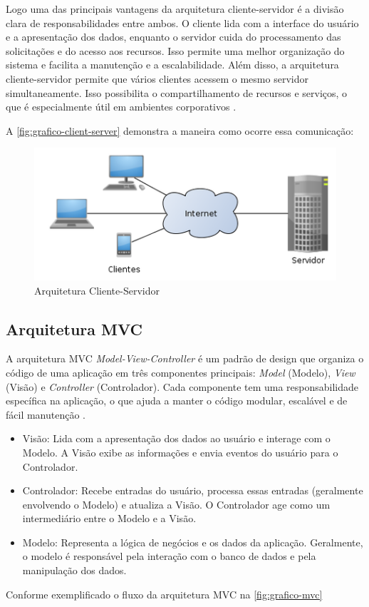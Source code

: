     Logo uma das principais vantagens da arquitetura cliente-servidor é a divisão clara de responsabilidades entre ambos. 
O cliente lida com a interface do usuário e a apresentação dos dados, enquanto o servidor cuida do processamento das solicitações e do acesso aos recursos. Isso permite uma melhor organização do sistema e facilita a manutenção e a escalabilidade.
Além disso, a arquitetura cliente-servidor permite que vários clientes acessem o mesmo servidor simultaneamente. Isso possibilita o compartilhamento de recursos e serviços, o que é especialmente útil em ambientes corporativos \cite{arqClientServer2}.

A \autoref{fig:grafico-client-server} demonstra a maneira como ocorre essa comunicação:

\begin{figure}[htb]
    \caption{\label{fig:grafico-client-server}Arquitetura Cliente-Servidor}
    \begin{center}
        \includegraphics[scale=0.9]{imagens/arquitetura-cliente-servidor.png}
    \end{center}
\end{figure}


\subsection{Arquitetura MVC}
A arquitetura MVC \textit{Model-View-Controller} é um padrão de design que organiza o código de uma aplicação em três componentes principais: \textit{Model} (Modelo), \textit{View} (Visão) e \textit{Controller} (Controlador). Cada componente tem uma responsabilidade específica na aplicação, o que ajuda a manter o código modular, escalável e de fácil manutenção \cite{engsoftmoderna}.

\begin{itemize}
    \item Visão: Lida com a apresentação dos dados ao usuário e interage com o Modelo. A Visão exibe as informações e envia eventos do usuário para o Controlador.
    \item Controlador: Recebe entradas do usuário, processa essas entradas (geralmente envolvendo o Modelo) e atualiza a Visão. O Controlador age como um intermediário entre o Modelo e a Visão.
    \item Modelo: Representa a lógica de negócios e os dados da aplicação. Geralmente, o modelo é responsável pela interação com o banco de dados e pela manipulação dos dados.
\end{itemize}
Conforme exemplificado o fluxo da arquitetura MVC na \autoref{fig:grafico-mvc}

